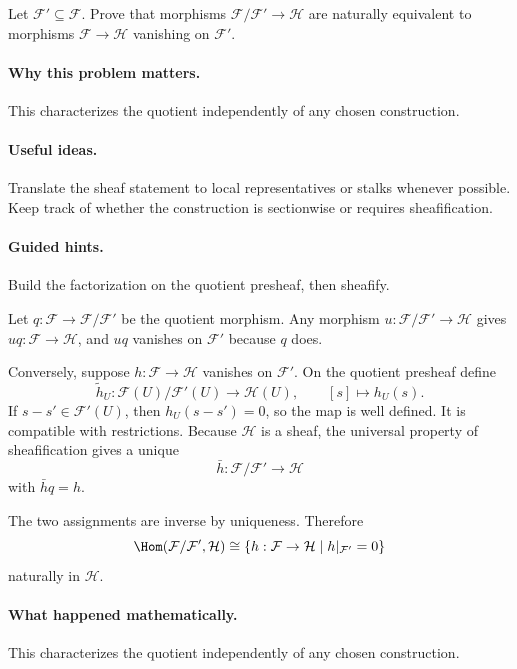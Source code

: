 \begin{problem}\label{prob:vi15-p8}
Let $\mathcal F'\subseteq\mathcal F$. Prove that morphisms $\mathcal F/\mathcal F'\to\mathcal H$ are naturally equivalent to morphisms $\mathcal F\to\mathcal H$ vanishing on $\mathcal F'$.
\end{problem}

\ifdefined\FullProblemDossiers
\paragraph{Why this problem matters.}
This characterizes the quotient independently of any chosen construction.

\paragraph{Useful ideas.}
Translate the sheaf statement to local representatives or stalks whenever possible.  Keep track of whether the construction is sectionwise or requires sheafification.

\paragraph{Guided hints.}
Build the factorization on the quotient presheaf, then sheafify.

\begin{solution}
Let $q:\mathcal F\to\mathcal F/\mathcal F'$ be the quotient morphism. Any morphism $u:\mathcal F/\mathcal F'\to\mathcal H$ gives $uq:\mathcal F\to\mathcal H$, and $uq$ vanishes on $\mathcal F'$ because $q$ does.

Conversely, suppose $h:\mathcal F\to\mathcal H$ vanishes on $\mathcal F'$. On the quotient presheaf define
\[
\widetilde h_U:\mathcal F(U)/\mathcal F'(U)\to\mathcal H(U),\qquad [s]\mapsto h_U(s).
\]
If $s-s'\in\mathcal F'(U)$, then $h_U(s-s')=0$, so the map is well defined. It is compatible with restrictions. Because $\mathcal H$ is a sheaf, the universal property of sheafification gives a unique
\[
\bar h:\mathcal F/\mathcal F'\to\mathcal H
\]
with $\bar hq=h$.

The two assignments are inverse by uniqueness. Therefore
\[
\Hom(\mathcal F/\mathcal F',\mathcal H)
\cong
\{h:\mathcal F\to\mathcal H\mid h|_{\mathcal F'}=0\}
\]
naturally in $\mathcal H$.
\end{solution}

\paragraph{What happened mathematically.}
This characterizes the quotient independently of any chosen construction.

